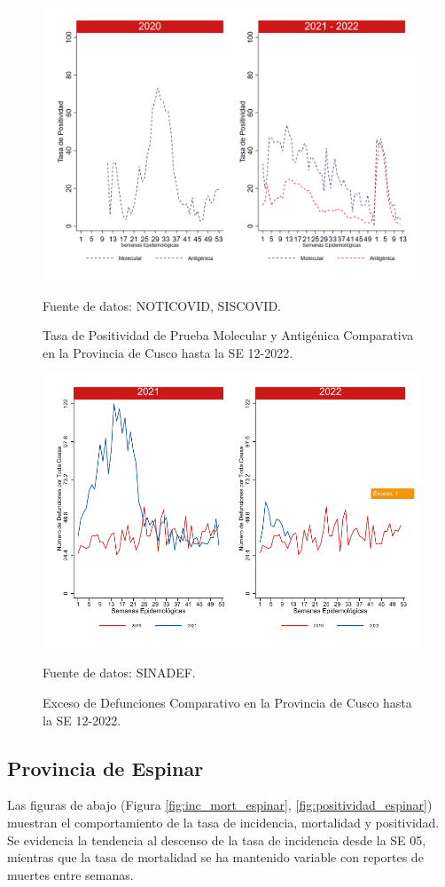 \documentclass[12pt,a4paper,openany]{book}
\begin{document}
		\begin{figure}[h]
			\caption{Tasa de Positividad de Prueba Molecular y Antigénica Comparativa en la Provincia de Cusco hasta la SE 12-2022.}\label{fig:positividad_cusco}
			\begin{center}
				\includegraphics[width=0.7\linewidth]{../figuras/positividad_20_21_7.png}
			\end{center}
			{\footnotesize {Fuente de datos: NOTICOVID, SISCOVID.}}
		\end{figure}
		
		\begin{figure}[h]
			\caption{Exceso de Defunciones Comparativo en la Provincia de Cusco hasta la SE 12-2022.}\label{fig:exceso_cusco}
			\begin{center}
				\includegraphics[width=0.7\linewidth]{../figuras/exceso_7.pdf}
			\end{center}
			{\footnotesize {Fuente de datos: SINADEF.}}
		\end{figure}
		
		\clearpage
		
		\subsection*{Provincia de Espinar}
		\noindent Las figuras de abajo (Figura \ref{fig:inc_mort_espinar}, \ref{fig:positividad_espinar}) muestran el comportamiento de la tasa de incidencia, mortalidad y positividad. Se evidencia la tendencia al descenso de la tasa de incidencia desde la SE 05, mientras que la tasa de mortalidad se ha mantenido variable con reportes de muertes entre semanas.
		
\end{document}
